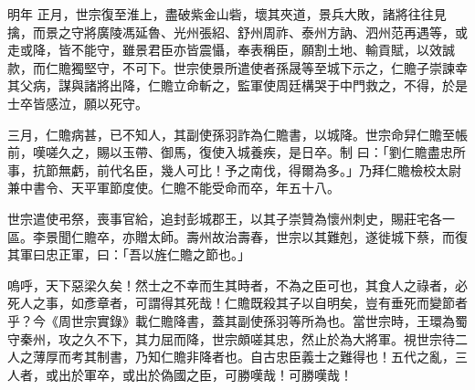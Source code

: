 \begin{pinyinscope}
 明年
 正月，世宗復至淮上，盡破紫金山砦，壞其夾道，景兵大敗，諸將往往見擒，而景之守將廣陵馮延魯、光州張紹、舒州周祚、泰州方訥、泗州范再遇等，或走或降，皆不能守，雖景君臣亦皆震懾，奉表稱臣，願割土地、輸貢賦，以效誠款，而仁贍獨堅守，不可下。世宗使景所遣使者孫晟等至城下示之，仁贍子崇諫幸其父病，謀與諸將出降，仁贍立命斬之，監軍使周廷構哭于中門救之，不得，於是士卒皆感泣，願以死守。



 三月，仁贍病甚，已不知人，其副使孫羽詐為仁贍書，以城降。世宗命舁仁贍至帳前，嘆嗟久之，賜以玉帶、御馬，復使入城養疾，是日卒。制
 曰：「劉仁贍盡忠所事，抗節無虧，前代名臣，幾人可比！予之南伐，得爾為多。」乃拜仁贍檢校太尉兼中書令、天平軍節度使。仁贍不能受命而卒，年五十八。



 世宗遣使弔祭，喪事官給，追封彭城郡王，以其子崇贊為懷州刺史，賜莊宅各一區。李景聞仁贍卒，亦贈太師。壽州故治壽春，世宗以其難剋，遂徙城下蔡，而復其軍曰忠正軍，曰：「吾以旌仁贍之節也。」



 嗚呼，天下惡梁久矣！然士之不幸而生其時者，不為之臣可也，其食人之祿者，必死人之事，如彥章者，可謂得其死哉！仁贍既殺其子以自明矣，豈有垂死而變節者
 乎？今《周世宗實錄》載仁贍降書，蓋其副使孫羽等所為也。當世宗時，王環為蜀守秦州，攻之久不下，其力屈而降，世宗頗嗟其忠，然止於為大將軍。視世宗待二人之薄厚而考其制書，乃知仁贍非降者也。自古忠臣義士之難得也！五代之亂，三人者，或出於軍卒，或出於偽國之臣，可勝嘆哉！可勝嘆哉！



\end{pinyinscope}